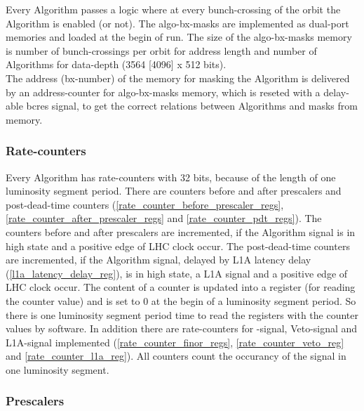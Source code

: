 Every Algorithm passes a logic where at every bunch-crossing of the orbit the Algorithm is enabled (or not). The algo-bx-masks are implemented as dual-port memories
and loaded at the begin of run.
The size of the algo-bx-masks memory is number of bunch-crossings per orbit for address length and number of Algorithms for data-depth (3564 [4096] x 512 bits).\\
The address (bx-number) of the memory for masking the Algorithm is delivered by an address-counter for algo-bx-masks memory,
which is reseted with a delay-able bcres signal, to get the correct relations between Algorithms and masks from memory.

\subsubsection{Rate-counters}
\label{sec:fdl:rate_counters}

Every Algorithm has rate-counters with 32 bits, because of the length of one luminosity segment period. There are counters before and after prescalers and post-dead-time counters (\ref{rate_counter_before_prescaler_regs}, \ref{rate_counter_after_prescaler_regs} and \ref{rate_counter_pdt_regs}).
The counters before and after prescalers are incremented, if the Algorithm signal is in high state and a positive edge of LHC clock occur. The post-dead-time counters are incremented, if the Algorithm signal, delayed by L1A latency delay (\ref{l1a_latency_delay_reg}), is in high state, a L1A signal and a positive edge of LHC clock occur.
The content of a counter is updated into a register (for reading the counter value) and is set to 0 at the begin of a luminosity segment period.
So there is one luminosity segment period time to read the registers with the counter values by software.
In addition there are rate-counters for \finor-signal, Veto-signal and L1A-signal implemented (\ref{rate_counter_finor_regs}, \ref{rate_counter_veto_reg} and \ref{rate_counter_l1a_reg}). All counters count the occurancy of the signal in one luminosity segment.

\subsubsection{Prescalers}
\label{sec:fdl:pre_scalers}


